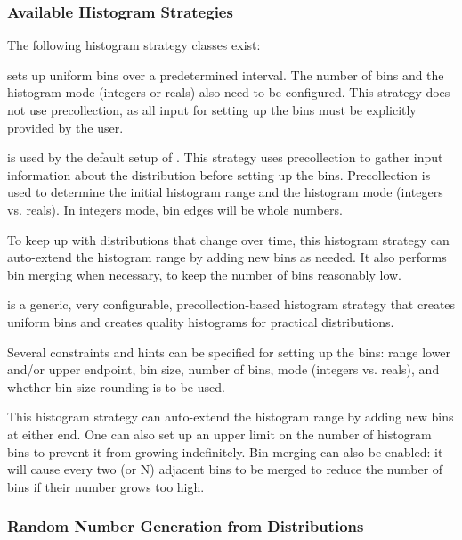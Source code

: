 \subsubsection{Available Histogram Strategies}
\label{sec:sim-lib:available-histogram-strategies}

The following histogram strategy classes exist:

 sets up uniform bins over
a predetermined interval. The number of bins and the histogram mode
(integers or reals) also need to be configured. This strategy does
not use precollection, as all input for setting up the bins must be
explicitly provided by the user.

 is used by the default setup of .
This strategy uses precollection to gather input information about the
distribution before setting up the bins. Precollection is used to determine
the initial histogram range and the histogram mode (integers vs. reals).
In integers mode, bin edges will be whole numbers.

To keep up with distributions that change over time, this histogram strategy
can auto-extend the histogram range by adding new bins as needed. It also
performs bin merging when necessary, to keep the number of bins reasonably low.

 is a generic, very configurable,
precollection-based histogram strategy that creates uniform bins and
creates quality histograms for practical distributions.

Several constraints and hints can be specified for setting up the bins:
range lower and/or upper endpoint, bin size, number of bins,
mode (integers vs. reals), and whether bin size rounding is to be used.

This histogram strategy can auto-extend the histogram range by adding new
bins at either end. One can also set up an upper limit on the number of
histogram bins to prevent it from growing indefinitely. Bin merging can
also be enabled: it will cause every two (or N) adjacent bins to be
merged to reduce the number of bins if their number grows too high.


\subsubsection{Random Number Generation from Distributions}
\label{sec:sim-lib:random-number-generation-from-distributions}


